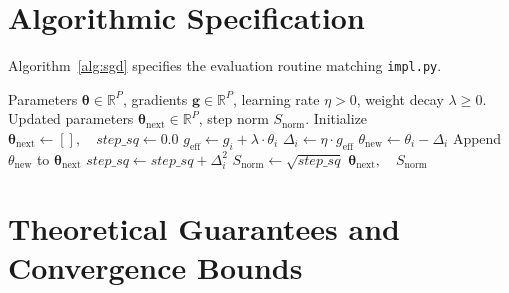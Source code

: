 \documentclass[11pt]{article}
\begin{document}
\section{Algorithmic Specification}
\label{sec:algorithm}

Algorithm~\ref{alg:sgd} specifies the evaluation routine matching \texttt{impl.py}.

\begin{algorithm}[H]
\caption{Stochastic Gradient Descent (SGD) Parameter Update}
\label{alg:sgd}
\begin{algorithmic}[1]
\Require Parameters $\boldsymbol{\theta} \in \mathbb{R}^P$, gradients $\mathbf{g} \in \mathbb{R}^P$, learning rate $\eta > 0$, weight decay $\lambda \ge 0$.
\Ensure Updated parameters $\boldsymbol{\theta}_{\mathrm{next}} \in \mathbb{R}^P$, step norm $S_{\mathrm{norm}}$.
\State Initialize $\boldsymbol{\theta}_{\mathrm{next}} \gets [], \quad step\_sq \gets 0.0$
    \State $g_{\mathrm{eff}} \gets g_i + \lambda \cdot \theta_i$
    \State $\Delta_i \gets \eta \cdot g_{\mathrm{eff}}$
    \State $\theta_{\mathrm{new}} \gets \theta_i - \Delta_i$
    \State Append $\theta_{\mathrm{new}}$ to $\boldsymbol{\theta}_{\mathrm{next}}$
    \State $step\_sq \gets step\_sq + \Delta_i^2$
\EndFor
\State $S_{\mathrm{norm}} \gets \sqrt{step\_sq}$
\State \Return $\boldsymbol{\theta}_{\mathrm{next}}, \quad S_{\mathrm{norm}}$
\end{algorithmic}
\end{algorithm}

\section{Theoretical Guarantees and Convergence Bounds}
\label{sec:guarantees}
\end{document}

